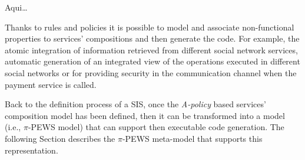 {\color{magenta} Aqui\dots  }

Thanks to rules and policies  it is possible to model and associate non-functional properties to services' compositions  and then generate the code. For example, the atomic integration of information retrieved from different social network services, automatic generation of an integrated view of the operations executed in different social networks or for providing security in the communication channel when the payment service is called.

Back to the  definition process of a SIS, once the {\em A-policy} based services' composition model has been defined, then it can be transformed into a model (i.e., $\pi$-PEWS model) that can support then executable code generation. The following Section describes the $\pi$-PEWS  meta-model that supports this representation. 


